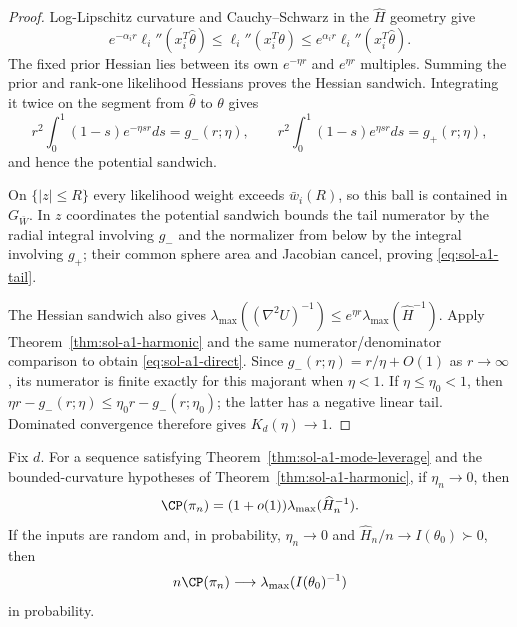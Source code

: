 \documentclass[../main.tex]{subfiles}
\begin{document}
\begin{proof}
Log-Lipschitz curvature and Cauchy--Schwarz in the $\widehat H$ geometry give
\[
 e^{-\alpha_i r}\ell_i''(x_i^T\hat\theta)
 \le\ell_i''(x_i^T\theta)
 \le e^{\alpha_i r}\ell_i''(x_i^T\hat\theta).
\]
The fixed prior Hessian lies between its own $e^{-\eta r}$ and $e^{\eta r}$ multiples.  Summing
the prior and rank-one likelihood Hessians proves the Hessian sandwich.  Integrating it twice on
the segment from $\hat\theta$ to $\theta$ gives
\[
 r^2\int_0^1(1-s)e^{-\eta sr}ds=g_-(r;\eta),\qquad
 r^2\int_0^1(1-s)e^{\eta sr}ds=g_+(r;\eta),
\]
and hence the potential sandwich.

On $\{|z|\le R\}$ every likelihood weight exceeds $\bar w_i(R)$, so this ball is contained in
$G_{\bar W}$.  In $z$ coordinates the potential sandwich bounds the tail numerator by the radial
integral involving $g_-$ and the normalizer from below by the integral involving $g_+$; their
common sphere area and Jacobian cancel, proving \eqref{eq:sol-a1-tail}.

The Hessian sandwich also gives
$\lambda_{\max}((\nabla^2U)^{-1})
\le e^{\eta r}\lambda_{\max}(\widehat H^{-1})$.  Apply
Theorem~\ref{thm:sol-a1-harmonic} and the same numerator/denominator comparison to obtain
\eqref{eq:sol-a1-direct}.  Since
$g_-(r;\eta)=r/\eta+O(1)$ as $r\to\infty$, its numerator is finite exactly for this majorant when
$\eta<1$.  If $\eta\le\eta_0<1$, then
$\eta r-g_-(r;\eta)\le\eta_0r-g_-(r;\eta_0)$; the latter has a negative linear tail.
Dominated convergence therefore gives $K_d(\eta)\to1$.
\end{proof}

\begin{corollary}
\label{cor:sol-a1-leverage-asymptotic}
Fix $d$.  For a sequence satisfying Theorem~\ref{thm:sol-a1-mode-leverage} and the bounded-curvature
hypotheses of Theorem~\ref{thm:sol-a1-harmonic}, if $\eta_n\to0$, then
\[
 \CP(\pi_n)=(1+o(1))\lambda_{\max}(\widehat H_n^{-1}).
\]
If the inputs are random and, in probability, $\eta_n\to0$ and
$\widehat H_n/n\to I(\theta_0)\succ0$, then
\[
 n\CP(\pi_n)\longrightarrow\lambda_{\max}(I(\theta_0)^{-1})
\]
in probability.
\end{corollary}
\end{document}
